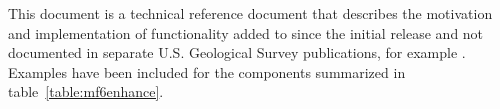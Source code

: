 This document is a technical reference document that describes the motivation and implementation of functionality added to \mf since the initial release \citep{modflow6framework, modflow6gwf} and not documented in separate U.S. Geological Survey publications, for example \cite{modflow6xt3d}. Examples have been included for the \mf components summarized in table~\ref{table:mf6enhance}.



